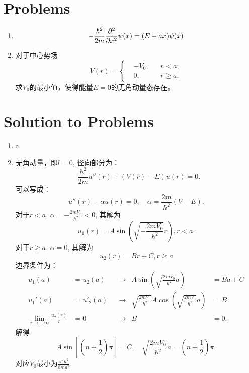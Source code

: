 \section*{Problems}
\begin{enumerate}
    \item \begin{equation}
        -\frac{\hbar^2}{2m}\frac{\partial^2 }{\partial x^2}\psi(x)=(E-ax)\psi(x)
    \end{equation}
    \item 对于中心势场
    \begin{equation}
        V(r)=\left\lbrace
        \begin{aligned}
            &-V_0, && r<a;\\
            &0, && r\ge a.
        \end{aligned}\right.
    \end{equation}
    求$V_0$的最小值，使得能量$E=0$的无角动量态存在。
\end{enumerate}

\newpage
\section*{Solution to Problems}
\begin{enumerate}
    \item a
    \item 无角动量，即$l=0$, 径向部分为：
        \begin{equation}
                -\frac{\hbar^2}{2m}u''(r)+(V(r)-E)u(r)=0.
        \end{equation}
        可以写成：
        \begin{equation}
            u''(r)-\alpha u(r)=0,\quad \alpha = \frac{2m}{\hbar^2}(V-E).
        \end{equation}
        对于$r<a$, $\alpha=-\frac{2mV_0}{\hbar^2}<0$, 其解为 
        \begin{equation}
            u_1(r)=A\sin\left(\sqrt{-\frac{2mV_0}{\hbar^2}}r\right),r<a.
        \end{equation}
        对于$r\ge a$, $\alpha=0$, 其解为 
        \begin{equation}
            u_2(r)=Br+C, r\ge a
        \end{equation}
        边界条件为：
        \begin{align}
            u_1(a)&=u_2(a) &&\to &A\sin\left(\sqrt{\frac{2mV_0}{\hbar^2}}a\right)&=Ba+C\\
            u_1'(a)&=u'_2(a) &&\to &\sqrt{\frac{2mV_0}{\hbar^2}}A\cos\left(\sqrt{\frac{2mV_0}{\hbar^2}}a\right)&=B\\
            \lim_{r\to+\infty}\frac{u_2(r)}{r}&=0 &&\to &B&=0.
        \end{align}
        解得\begin{equation}
            A\sin[(n+\frac{1}{2})\pi]=C, \quad\sqrt{\frac{2mV_0}{\hbar^2}}a=(n+\frac{1}{2})\pi.
        \end{equation}
        对应$V_0$最小为$\frac{\pi^2\hbar^2}{8ma^2}$.
\end{enumerate}



